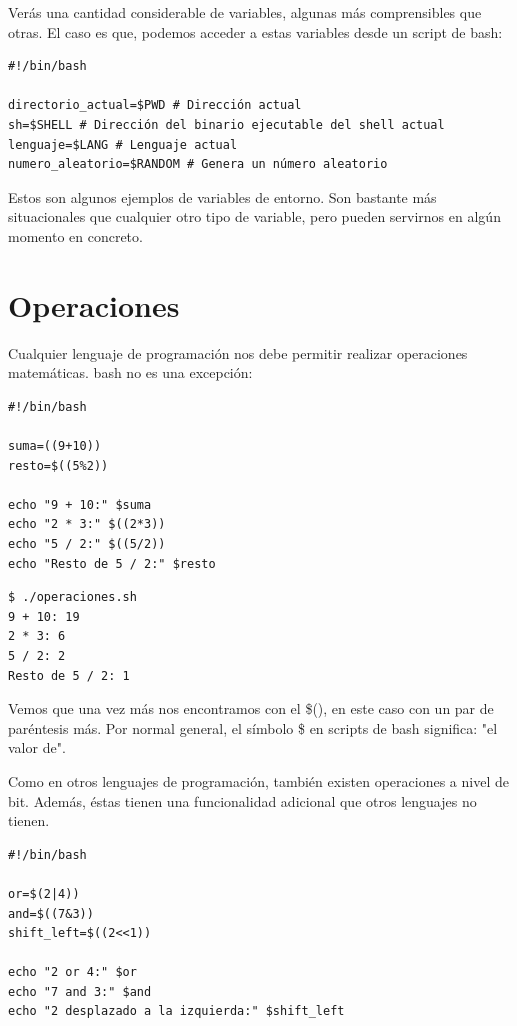 Verás una cantidad considerable de variables, algunas más comprensibles que otras. El caso es que, podemos acceder a estas variables desde un script de bash:

\begin{tcolorbox-code}
\begin{lstlisting}
#!/bin/bash

directorio_actual=$PWD # Dirección actual
sh=$SHELL # Dirección del binario ejecutable del shell actual
lenguaje=$LANG # Lenguaje actual
numero_aleatorio=$RANDOM # Genera un número aleatorio
\end{lstlisting}
\end{tcolorbox-code}

Estos son algunos ejemplos de variables de entorno. Son bastante más situacionales que cualquier otro tipo de variable, pero pueden servirnos en algún momento en concreto.

\section{Operaciones}

Cualquier lenguaje de programación nos debe permitir realizar operaciones matemáticas. bash no es una excepción:

\begin{tcolorbox-code}
\begin{lstlisting}
#!/bin/bash

suma=((9+10))
resto=$((5%2))

echo "9 + 10:" $suma
echo "2 * 3:" $((2*3))
echo "5 / 2:" $((5/2))
echo "Resto de 5 / 2:" $resto
\end{lstlisting}
\end{tcolorbox-code}

\begin{tcolorbox-code}
\begin{lstlisting}
$ ./operaciones.sh
9 + 10: 19
2 * 3: 6
5 / 2: 2
Resto de 5 / 2: 1
\end{lstlisting}
\end{tcolorbox-code}

Vemos que una vez más nos encontramos con el \$(), en este caso con un par de paréntesis más. Por normal general, el símbolo \$ en scripts de bash significa: "el valor de".

Como en otros lenguajes de programación, también existen operaciones a nivel de bit. Además, éstas tienen una funcionalidad adicional que otros lenguajes no tienen.

\begin{tcolorbox-code}
\begin{lstlisting}
#!/bin/bash

or=$(2|4))
and=$((7&3))
shift_left=$((2<<1))

echo "2 or 4:" $or
echo "7 and 3:" $and
echo "2 desplazado a la izquierda:" $shift_left
\end{lstlisting}
\end{tcolorbox-code}

